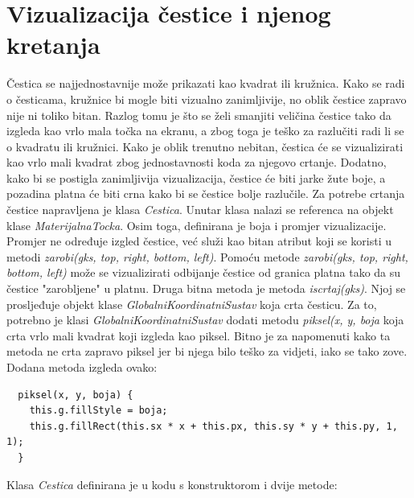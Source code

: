 \documentclass{foi}
\begin{document}
\section{Vizualizacija čestice i njenog kretanja}
Čestica se najjednostavnije može prikazati kao kvadrat ili kružnica. Kako se radi o česticama, kružnice bi mogle biti vizualno zanimljivije, no oblik čestice zapravo nije ni toliko bitan. Razlog tomu je što se želi smanjiti veličina čestice tako da izgleda kao vrlo mala točka na ekranu, a zbog toga je teško za razlučiti radi li se o kvadratu ili kružnici. Kako je oblik trenutno nebitan, čestica će se vizualizirati kao vrlo mali kvadrat zbog jednostavnosti koda za njegovo crtanje. Dodatno, kako bi se postigla zanimljivija vizualizacija, čestice će biti jarke žute boje, a pozadina platna će biti crna kako bi se čestice bolje razlučile. Za potrebe crtanja čestice napravljena je klasa \textit{Cestica}. Unutar klasa nalazi se referenca na objekt klase \textit{MaterijalnaTocka}. Osim toga, definirana je boja i promjer vizualizacije. Promjer ne određuje izgled čestice, već služi kao bitan atribut koji se koristi u metodi \textit{zarobi(gks, top, right, bottom, left)}. Pomoću metode \textit{zarobi(gks, top, right, bottom, left)} može se vizualizirati odbijanje čestice od granica platna tako da su čestice "zarobljene" u platnu. Druga bitna metoda je metoda \textit{iscrtaj(gks)}. Njoj se prosljeđuje objekt klase \textit{GlobalniKoordinatniSustav} koja crta česticu. Za to, potrebno je klasi \textit{GlobalniKoordinatniSustav} dodati metodu \textit{piksel(x, y, boja} koja crta vrlo mali kvadrat koji izgleda kao piksel. Bitno je za napomenuti kako ta metoda ne crta zapravo piksel jer bi njega bilo teško za vidjeti, iako se tako zove. Dodana metoda izgleda ovako:

\begin{verbatim}
  piksel(x, y, boja) {
    this.g.fillStyle = boja;
    this.g.fillRect(this.sx * x + this.px, this.sy * y + this.py, 1, 1);
  }
\end{verbatim}

Klasa \textit{Cestica} definirana je u kodu s konstruktorom i dvije metode:
\end{document}
